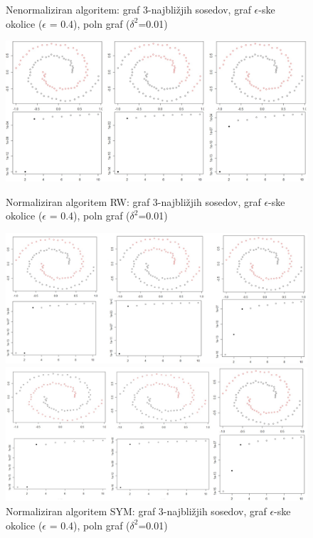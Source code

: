 \documentclass[a4paper, 10pt]{article}
\begin{document}
\begin{figure}[ht]
\caption{Nenormaliziran algoritem: graf 3-najbližjih sosedov, graf $\epsilon$-ske okolice ($\epsilon$ = 0.4), poln graf ($\delta^2$=0.01)}
\includegraphics[width=\textwidth]{unnorm-spiral}

\caption{Normaliziran algoritem RW: graf 3-najbližjih sosedov, graf $\epsilon$-ske okolice ($\epsilon$ = 0.4), poln graf ($\delta^2$=0.01)}
\includegraphics[width=\textwidth]{norm-spiral}

\caption{Normaliziran algoritem SYM: graf 3-najbližjih sosedov, graf $\epsilon$-ske okolice ($\epsilon$ = 0.4), poln graf ($\delta^2$=0.01)}
\includegraphics[width=\textwidth]{norm-spiral-sym}
\end{figure}
\end{document}
